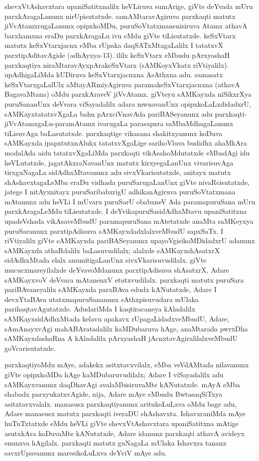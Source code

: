 shevxVtAshavxtara upaniSatitxnalilx heVLiruva sumArige, giVte deYvada mUru parxkAra\-gaLanunx nirUpisutatxde. samAMtaravAgiruva parxkaqti matutx jiVvAtamxrugaLanunx opipx\-koMDu, puruSoVtatxmanenisiruva Atamx athavA barxhamxna eraDu parxkAragaLu ivu eMdu giVte tiLisutatxde. keSxVtarx matutx keSxVtarxjacnx eMba rUpaka daqSATxMtagaLalilx I tatatxvX parxti\-pAdita\-vAgide (adhAyxya-{\rm 13}). ililx keSxVtarx eMbudu pArxyashaH parxkaqtiya niraMtaravAyxpAra\-keSxVtarx (sAMKoyxVkatx riVtiyalilx). upAdhigaLiMda kUDiruva keSxVtarxjacnxna AsAthxna adu. samasatx keSxVtarxgaLalUlx aMtayARmiyAgiruva paramakeSxVtarxjacnxna (athavA BagavaMtana) oMdu parxkAraveV jiVvAtamx. giVteyu sAMKayxda niSikxrXya puruSananUnx deVvara viSaya\-dalilx adara mwnavanUnx opipxkoLaLxdidadxrU, sAMKayxtatatxvXgaLa bahu pArxciVnavAda pari\-BASeyanunx adu parxkaqti-jiVvAtamxgaLu-paramAtamx ivarugaLa parasapxra saMbaMdhagaLanunx tiLisuvAga baLasutatxde. parxkaqtige vikasana shakitxyanunx koDuva sAMKayxda ipapxtutxnAlukx tatatxvXgaLige sarihoVluva budidhx ahaMkAra modalAda aidu tatatxvXgaLiMda parxkaqti vikAsahoMdutatxde eMbadAgi idu heVLutatxde, jagatAkxraNavanUnx matutx kirxyegaLanUnx vivarisuvAga tirxguNagaLa sidAdhxMtavanunx adu sivxVkarisutatxde, anitayx matutx shAshavxtagaLeMba eraDu vidhada puruSarugaLanUnx giVte nivaRcisutatxde, jatege I nitAyxnitayx puruSaribabxrigU adhikanAgiruva puruSoVtatxmana mAtanunx adu heVLi I mUvaru puruSarU obabxneV Ada paramapuruSana mUru parxkAragaLeMdu tiLisutatxde. I deYvikapuruSasidAdhxMtavu upaniSatitxna upadeVshada vikAsaveMbudU paramapuruSana mAtetatxde anaMta saMKeyxya puruSaranunx parxtipAdisuva sAMKayxdadxlalxveMbudU sapxSaTx. I riVtiyalilx giVte sAMKayxda pariBASeyanunx upayoVgisikoMDidadxrU adanunx sAMKayxda athaRdalilx baLasuvudilalx; alalxde sAMKayxshAsatxrX sidAdhxMtada elalx anumitigaLanUnx sivxVkarisuvudilalx. giVte mucucxmareyilalxde deYvavoMdanunx parxtipAdisuva shAsatxrX, Adare sAMKayxvoV deVvara mAtanenxV etutxvudilalx. parxkaqti matutx puruSara pariBAvaneyalilx sAMKayxda parxBAva edudx kANutatxde, Adare I devxYtaBAva utatxmapuruSananunx sAthxpisuvudara mUlaka parihaqtavAgutatxde. AdudariMda I kaqtiracaneya kAladalilx sAMKayxsidAdhxMtada kelavu apakavx rUpagaLidadxveMbudU, Adare, sAmAnayxvAgi mahABAratadalilx kaMDubaruva hAge, anaMtarada pwrxDha sAMKayxdashaRna A kAladalilx pArxyashaH jAcnxtavAgiralilalxveMbudU goVcarisutatxde.

parxkaqtiyoMdu mAye, adakekx asitxtavxvilalx, eMba veVdAMtada nilavanunx giVte opipxkoMDa hAge kaMDubaruvudilalx; Adare I viSayadalilx adu sAMKayxvanunx daqDhavAgi avalaMbisiruvaMte kANutatxde. mAyA eMba shabadx parxyukatxvAgide, nija, Adare mAye eMbudu BwtasaqSiTxya asitxtavxvalalx. manasusx parxkaqtiyanunx aritukoLuLxva oMdu bage adu, Adare manasusx matutx parxkaqti iveraDU shAshavxta. IshavxraniMda mAye huTuTxtatxde eMdu heVLi giVte shevxVtAshavxtara upaniSatitxna mAtige asutxkAra koDuvaMte kANutatxde, Adare idanunx parxkaqti athavA avideyx enunxva hAgilalx. parxkaqti matutx guNagaLa mUlaka Ishavxra tananx savxrUpavanunx maresikoLuLxva deYviV mAye adu.

